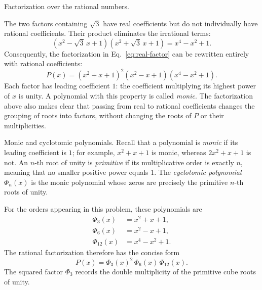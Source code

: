 \documentclass[11pt,aspectratio=169]{beamer}
\newcommand{\slidebody}{%
  \fontsize{10.6}{12.8}\selectfont\justifying%
  \setlength{\parskip}{4.2pt}%
  \setlength{\abovedisplayskip}{4pt}%
  \setlength{\belowdisplayskip}{4pt}%
  \setlength{\abovedisplayshortskip}{2pt}%
  \setlength{\belowdisplayshortskip}{2.5pt}%
}
\newcommand{\tightbody}{\slidebody\fontsize{10.2}{12.3}\selectfont\setlength{\parskip}{3pt}}
\begin{document}
\begin{frame}[t]{Factorization over the rational numbers.}
\slidebody
The two factors containing $\sqrt{3}$ have real coefficients but do not individually have rational coefficients. Their product eliminates the irrational terms:
\begin{equation}\label{eq:rational-merge}
 (x^2-\sqrt{3}\,x+1)(x^2+\sqrt{3}\,x+1)=x^4-x^2+1.
\end{equation}
Consequently, the factorization in Eq.~\eqref{eq:real-factor} can be rewritten entirely with rational coefficients:
\begin{equation}\label{eq:rational-factor}
 P(x)=(x^2+x+1)^2(x^2-x+1)(x^4-x^2+1).
\end{equation}
Each factor has leading coefficient $1$: the coefficient multiplying its highest power of $x$ is unity. A polynomial with this property is called \emph{monic}. The factorization above also makes clear that passing from real to rational coefficients changes the grouping of roots into factors, without changing the roots of $P$ or their multiplicities.
\end{frame}

\begin{frame}[t]{Monic and cyclotomic polynomials.}
\tightbody
Recall that a polynomial is \emph{monic} if its leading coefficient is $1$; for example, $x^2+x+1$ is monic, whereas $2x^2+x+1$ is not. An $n$-th root of unity is \emph{primitive} if its multiplicative order is exactly $n$, meaning that no smaller positive power equals $1$. The \emph{cyclotomic polynomial} $\Phi_n(x)$ is the monic polynomial whose zeros are precisely the primitive $n$-th roots of unity.

For the orders appearing in this problem, these polynomials are
\begin{equation}\label{eq:phi-explicit}
\begin{aligned}
 \Phi_3(x)&=x^2+x+1,\\
 \Phi_6(x)&=x^2-x+1,\\
 \Phi_{12}(x)&=x^4-x^2+1.
\end{aligned}
\end{equation}
The rational factorization therefore has the concise form
\begin{equation}\label{eq:cyclotomic}
 P(x)=\Phi_3(x)^2\,\Phi_6(x)\,\Phi_{12}(x).
\end{equation}
The squared factor $\Phi_3$ records the double multiplicity of the primitive cube roots of unity.
\end{frame}
\end{document}
